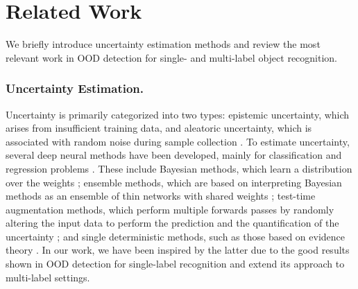 \section{Related Work}
\label{sec:relatedwork}

\begin{comment}

\cite{wang2021neurips}
\cite{mei2024energy}
\cite{wang2022ivc}
\cite{hendrycks2022icml}
\cite{zhao2023open}
\cite{zhao2023towards}
\end{comment}

We briefly introduce uncertainty estimation methods and review the most relevant work in OOD detection for single- and multi-label object recognition.

\subsubsection{Uncertainty Estimation.}
Uncertainty is primarily categorized into two types: epistemic uncertainty, which arises from insufficient training data, and aleatoric uncertainty, which is associated with random noise during sample collection \cite{kendall2017uncertainties}.
To estimate uncertainty, several deep neural methods have been developed, mainly for classification and regression problems \cite{gawlikowski2021survey}. These include Bayesian methods, which learn a distribution over the weights \cite{blundell2015weight};  ensemble methods, which are based on interpreting Bayesian methods as an ensemble of thin networks with shared weights \cite{lakshminarayanan2017simple}; test-time augmentation methods, which perform multiple forwards passes by randomly altering the input data to perform the prediction and the quantification of the uncertainty \cite{wang2019aleatoric}; and single deterministic methods, such as those based on evidence theory \cite{sensoy2018evidential}. In our work, we have been inspired by the latter due to the good results shown in OOD detection for single-label recognition \cite{sensoy2018evidential} and extend its approach to multi-label settings. 

